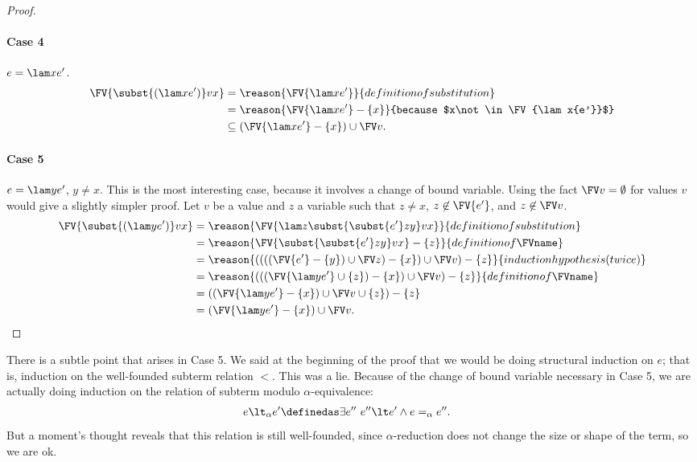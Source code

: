 \begin{proof}
\paragraph{Case 4}
$e = \lam x{e'}$.
\begin{align*}
\FV{\subst{(\lam x{e'})}vx}
&= \reason{\FV{\lam x{e'}}}{definition of substitution}\\
&= \reason{\FV{\lam x{e'}} - \{x\}}{because $x\not\in\FV{\lam x{e'}}$}\\
&\subseteq (\FV{\lam x{e'}} - \{x\}) \cup \FV v.
\end{align*}

\paragraph{Case 5}
$e = \lam y{e'}$, $y \neq x$. This is the most interesting case, because it involves a change of bound variable. Using the fact $\FV v = \emptyset$ for values $v$ would give a slightly simpler proof. Let $v$ be a value and $z$ a variable such that $z\neq x$, $z\not\in\FV{e'}$, and $z\not\in\FV v$.
\begin{align*}
\FV{\subst{(\lam y{e'})}vx}
&= \reason{\FV{\lam z{\subst{\subst{e'}zy}vx}}}{definition of substitution}\\
&= \reason{\FV{\subst{\subst{e'}zy}vx} - \{z\}}{definition of \FVname}\\
&= \reason{((((\FV{e'} - \{y\}) \cup \FV z) - \{x\}) \cup \FV v) - \{z\}}{induction hypothesis (twice)}\\
&= \reason{(((\FV{\lam y{e'}} \cup \{z\}) - \{x\}) \cup \FV v) - \{z\}}{definition of \FVname}\\
&= ((\FV{\lam y{e'}} - \{x\}) \cup \FV v \cup \{z\}) - \{z\}\\
&= (\FV{\lam y{e'}} - \{x\}) \cup \FV v.
\end{align*}
\end{proof}

There is a subtle point that arises in Case 5. We said at the beginning of the proof that we would be doing structural induction on $e$; that is, induction on the well-founded subterm relation $\lt$. This was a lie. Because of the change of bound variable necessary in Case 5, we are actually doing induction on the relation of subterm modulo $\alpha$-equivalence:
\begin{align*}
e \lt_\alpha e' &\definedas \exists e''\ e'' \lt e' \wedge e=_\alpha e''.
\end{align*}
But a moment's thought reveals that this relation is still well-founded, since $\alpha$-reduction does not change the size or shape of the term, so we are ok.

